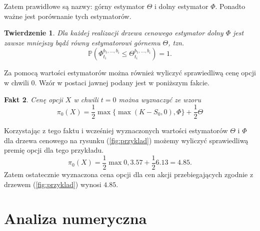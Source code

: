 \documentclass[]{pwr_wmat_praca_dyplomowa}
\theoremstyle{plain}
\newtheorem{theorem}{Twierdzenie}
\numberwithin{theorem}{chapter}
\newtheorem{fact}[theorem]{Fakt}
\theoremstyle{definition}
\numberwithin{theorem}{chapter}
\begin{document}
\noindent Zatem prawidłowe są nazwy: górny estymator $\Theta$ i dolny estymator $\Phi$. Ponadto ważne jest porównanie tych estymatorów.
\begin{theorem}
Dla każdej realizacji drzewa cenowego estymator dolny $\Phi$ jest zawsze mniejszy bądź równy estymatorowi górnemu $\Theta$, tzn.
\begin{equation*}
\mathbb{P}(\Phi_{t_i}^{b_1,\ldots,b_i}\leq \Theta_{t_i}^{b_1,\ldots,b_i}) = 1.
\end{equation*}
\end{theorem} 

\noindent Za pomocą wartości estymatorów można również wyliczyć sprawiedliwą cenę opcji w chwili $0$. Wzór w postaci jawnej podany jest w poniższym fakcie.
\begin{fact}
Cenę opcji $X$ w chwili $t=0$ można wyznaczyć ze wzoru
\begin{equation*}
\pi_0(X) = \frac{1}{2}\max\{\max(K-S_0,0),\Phi\} + \frac{1}{2}\Theta
\end{equation*}
\end{fact}

\noindent Korzystając z tego faktu i wcześniej wyznaczonych wartości estymatorów $\Theta$ i $\Phi$ dla drzewa cenowego na rysunku (\ref{fig:przyklad}) możemy wyliczyć sprawiedliwą premię opcji dla tego przykładu.
\begin{equation*}
\pi_0(X) = \frac{1}{2}\max{0,3.57}+\frac{1}{2} 6.13 = 4.85.
\end{equation*}
Zatem ostatecznie wyznaczona cena opcji dla cen akcji przebiegających zgodnie z drzewem (\ref{fig:przyklad}) wynosi $4.85.$
\chapter{Analiza numeryczna}
\end{document}
